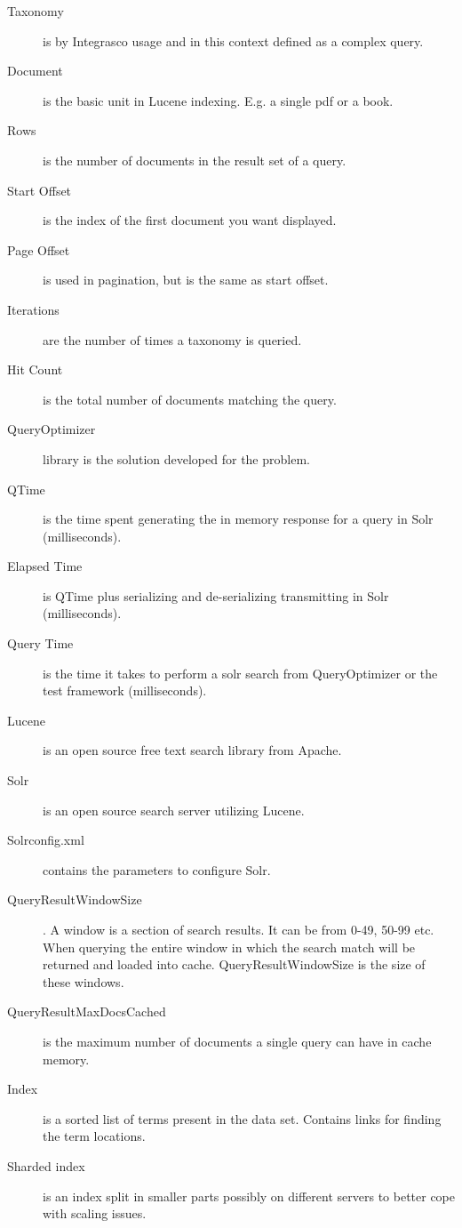 \documentclass[pdftex,12pt,final,a4paper]{report}
\begin{document}
\begin{description}

  \item[Taxonomy] is by Integrasco usage and in this context defined as a complex query.
  \item[Document] is the basic unit in Lucene indexing. E.g. a single pdf or a book.
  \item[Rows] is the number of documents in the result set of a query.
  \item[Start Offset] is the index of the first document you want displayed.
  \item[Page Offset] is used in pagination, but is the same as start offset.
  \item[Iterations] are the number of times a taxonomy is queried.
  \item[Hit Count] is the total number of documents matching the query.
  \item[QueryOptimizer] library is the solution developed for the problem.
  \item[QTime] is the time spent generating the in memory response for a query in Solr (milliseconds).
  \item[Elapsed Time] is QTime plus serializing and de-serializing transmitting in Solr (milliseconds).
  \item[Query Time] is the time it takes to perform a solr search from QueryOptimizer or the test framework (milliseconds).
  \item[Lucene] is an open source free text search library from Apache.
  \item[Solr] is an open source search server utilizing Lucene.
  \item[Solrconfig.xml] contains the parameters to configure Solr.
  \item[QueryResultWindowSize]. A window is a section of search results. It can be from 0-49, 50-99 etc. When querying the entire window in which the search match will be returned and loaded into cache. QueryResultWindowSize is the size of these windows.
  \item[QueryResultMaxDocsCached] is the maximum number of documents a single query can have in cache memory.
  \item[Index] is a sorted list of terms present in the data set. Contains links for finding the term locations.
  \item[Sharded index] is an index split in smaller parts possibly on different servers to better cope with scaling issues.
\end{description}

%
%
%
%
%
%
%








%	
%	




%
%
\end{document}
